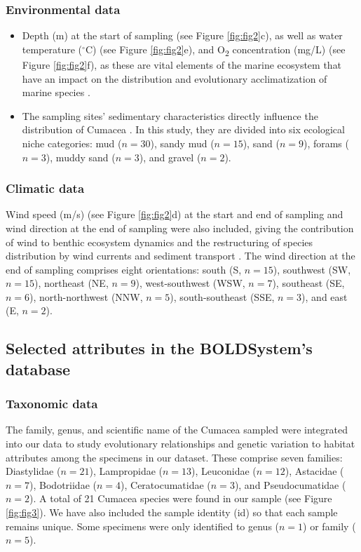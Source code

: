 {\subsubsection{Environmental data} 
\begin{itemize}
\item Depth (m) at the start of sampling (see Figure \ref{fig:fig2}c), as well as water temperature ($^\circ$C) (see Figure \ref{fig:fig2}e), and O\textsubscript{2} concentration (mg/L) (see Figure \ref{fig:fig2}f), as these are vital elements of the marine ecosystem that have an impact on the distribution and evolutionary acclimatization of marine species \citep{rex2006global, danovaro2010first}. 
\item The sampling sites' sedimentary characteristics directly influence the distribution of Cumacea \citep{uhlir_adding_2021}. In this study, they are divided into six ecological niche categories: mud ($n=30$), sandy mud ($n=15$), sand ($n=9$), forams ($n=3$), muddy sand ($n=3$), and gravel ($n=2$).
\end{itemize}

\subsubsection{Climatic data} 
Wind speed (m/s) (see Figure \ref{fig:fig2}d) at the start and end of sampling and wind direction at the end of sampling were also included, giving the contribution of wind to benthic ecosystem dynamics and the restructuring of species distribution by wind currents and sediment transport \citep{siedlecki2016experiments, waga_recent_2020,saeedi_environmental_2022}. The wind direction at the end of sampling comprises eight orientations: south (S, $n=15$), southwest (SW, $n=15$), northeast (NE, $n=9$), west-southwest (WSW, $n=7$), southeast (SE, $n=6$), north-northwest (NNW, $n=5$), south-southeast (SSE, $n=3$), and east (E, $n=2$). 

\subsection{Selected attributes in the BOLDSystem's database}
\subsubsection{Taxonomic data} 
The family, genus, and scientific name of the Cumacea sampled were integrated into our data to study evolutionary relationships and genetic variation to habitat attributes among the specimens in our dataset. These comprise seven families: Diastylidae ($n=21$), Lampropidae ($n=13$), Leuconidae ($n=12$), Astacidae ($n=7$), Bodotriidae ($n=4$), Ceratocumatidae ($n=3$), and Pseudocumatidae ($n=2$). A total of 21 Cumacea species were found in our sample (see Figure \ref{fig:fig3}). We have also included the sample identity (id) so that each sample remains unique. Some specimens were only identified to genus ($n=1$) or family ($n=5$).

}
